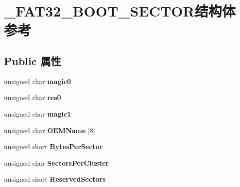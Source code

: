 \hypertarget{struct___f_a_t32___b_o_o_t___s_e_c_t_o_r}{}\section{\+\_\+\+F\+A\+T32\+\_\+\+B\+O\+O\+T\+\_\+\+S\+E\+C\+T\+O\+R结构体 参考}
\label{struct___f_a_t32___b_o_o_t___s_e_c_t_o_r}
\subsection*{Public 属性}
\begin{DoxyCompactItemize}
\item 
\mbox{\label{struct___f_a_t32___b_o_o_t___s_e_c_t_o_r_aa184b39ad22857cc36f58f9891b61a40}} 
unsigned char {\bfseries magic0}
\item 
\mbox{\label{struct___f_a_t32___b_o_o_t___s_e_c_t_o_r_a563558bcc7ea70a129a434728345f9c4}} 
unsigned char {\bfseries res0}
\item 
\mbox{\label{struct___f_a_t32___b_o_o_t___s_e_c_t_o_r_a5deca9941555c07789124a2770de40df}} 
unsigned char {\bfseries magic1}
\item 
\mbox{\label{struct___f_a_t32___b_o_o_t___s_e_c_t_o_r_ac8bb2cbac31ccaf3cfdd61dd5f0185da}} 
unsigned char {\bfseries O\+E\+M\+Name} \mbox{[}8\mbox{]}
\item 
\mbox{\label{struct___f_a_t32___b_o_o_t___s_e_c_t_o_r_a400fff2c06f80b5c60e9c790b980d255}} 
unsigned short {\bfseries Bytes\+Per\+Sector}
\item 
\mbox{\label{struct___f_a_t32___b_o_o_t___s_e_c_t_o_r_ae04c106a8f88f23825b113c1683e8809}} 
unsigned char {\bfseries Sectors\+Per\+Cluster}
\item 
\mbox{\label{struct___f_a_t32___b_o_o_t___s_e_c_t_o_r_a2109cd513ea32461815cb3ecf5094eb8}} 
unsigned short {\bfseries Reserved\+Sectors}

\end{DoxyCompactItemize}
